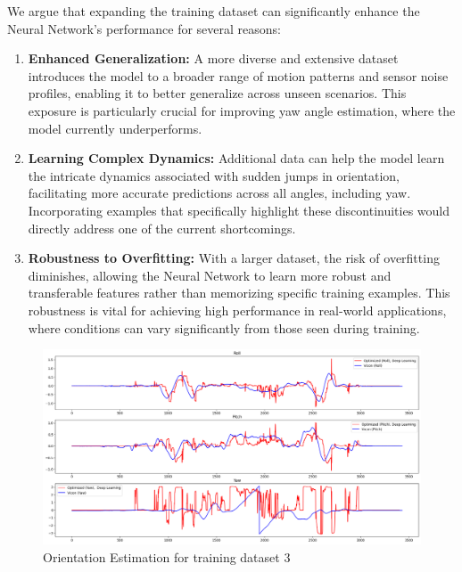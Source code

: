 \documentclass[conference]{IEEEtran}
\begin{document}
We argue that expanding the training dataset can significantly enhance the Neural Network's performance for several reasons:

\begin{enumerate}
\item \textbf{Enhanced Generalization:} A more diverse and extensive dataset introduces the model to a broader range of motion patterns and sensor noise profiles, enabling it to better generalize across unseen scenarios. This exposure is particularly crucial for improving yaw angle estimation, where the model currently underperforms.
\item \textbf{Learning Complex Dynamics:} Additional data can help the model learn the intricate dynamics associated with sudden jumps in orientation, facilitating more accurate predictions across all angles, including yaw. Incorporating examples that specifically highlight these discontinuities would directly address one of the current shortcomings.
\item \textbf{Robustness to Overfitting:} With a larger dataset, the risk of overfitting diminishes, allowing the Neural Network to learn more robust and transferable features rather than memorizing specific training examples. This robustness is vital for achieving high performance in real-world applications, where conditions can vary significantly from those seen during training.
\end{enumerate}

\begin{figure}[htbp]
  \centerline{\includegraphics[width=1.0\textwidth]{images/dataset_3.png}}
\caption{Orientation Estimation for training dataset 3}
\label{fig:dataset_3}
\end{figure}
\end{document}

